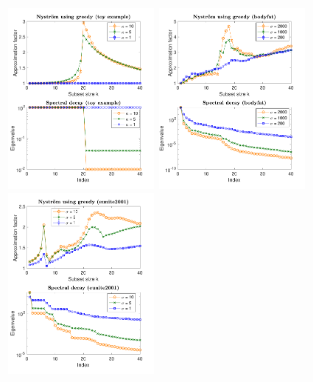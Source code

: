 \documentclass{article}
\begin{document}
 \begin{figure}[t]
  \centering
  \ifisarxiv
    \includegraphics[width=0.345\textwidth]{figs/nystrom/rbf-toy-greedy}
   \hspace{-6mm}
  \includegraphics[width=0.345\textwidth]{figs/nystrom/rbf-bodyfat-greedy}
  \hspace{-6mm}
  \includegraphics[width=0.345\textwidth]{figs/nystrom/rbf-eunite2001-greedy}
  \else
  ~\hspace{-5mm}

\end{figure}
\end{document}
